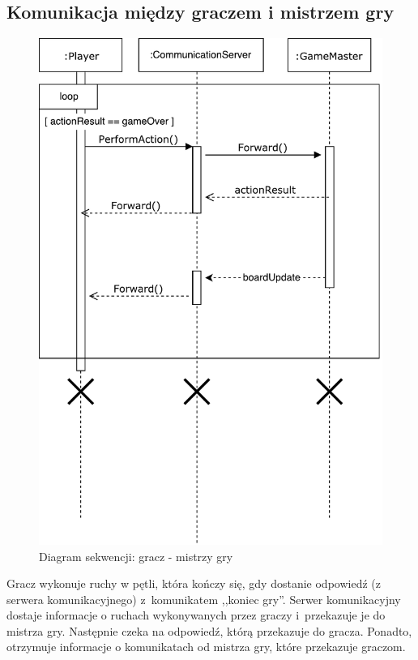 \documentclass[a4paper]{article}
\begin{document}
\subsection{Komunikacja między graczem i mistrzem gry}
\begin{figure}[H]
\caption{Diagram sekwencji: gracz - mistrzy gry}
\centering
\includegraphics[scale=0.8]{sekwencje2.pdf}
\end{figure}

Gracz wykonuje ruchy w pętli, która kończy się, gdy dostanie odpowiedź (z serwera komunikacyjnego) z~komunikatem ,,koniec gry''.
Serwer komunikacyjny dostaje informacje o ruchach wykonywanych przez graczy i~przekazuje je do mistrza gry.
Następnie czeka na odpowiedź, którą przekazuje do gracza.
Ponadto, otrzymuje informacje o komunikatach od mistrza gry, które przekazuje graczom.
\end{document}
